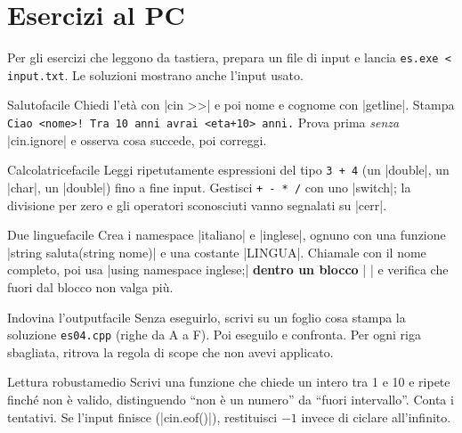 \section{Esercizi al PC}

Per gli esercizi che leggono da tastiera, prepara un file di input e lancia
\texttt{es.exe < input.txt}. Le soluzioni mostrano anche l'input usato.

\begin{esercizio}{Saluto}{facile}
Chiedi l'età con \cc|cin >>| e poi nome e cognome con \cc|getline|. Stampa
\texttt{Ciao <nome>! Tra 10 anni avrai <eta+10> anni.} Prova prima
\emph{senza} \cc|cin.ignore| e osserva cosa succede, poi correggi.
\end{esercizio}

\begin{esercizio}{Calcolatrice}{facile}
Leggi ripetutamente espressioni del tipo \texttt{3 + 4} (un \cc|double|, un
\cc|char|, un \cc|double|) fino a fine input. Gestisci \texttt{+ - * /} con uno
\cc|switch|; la divisione per zero e gli operatori sconosciuti vanno segnalati su \cc|cerr|.
\end{esercizio}

\begin{esercizio}{Due lingue}{facile}
Crea i namespace \cc|italiano| e \cc|inglese|, ognuno con una funzione
\cc|string saluta(string nome)| e una costante \cc|LINGUA|. Chiamale con il nome
completo, poi usa \cc|using namespace inglese;| \textbf{dentro un blocco}
\cc|{ }| e verifica che fuori dal blocco non valga più.
\end{esercizio}

\begin{esercizio}{Indovina l'output}{facile}
Senza eseguirlo, scrivi su un foglio cosa stampa la soluzione
\texttt{es04.cpp} (righe da A a F). Poi eseguilo e confronta. Per ogni riga
sbagliata, ritrova la regola di scope che non avevi applicato.
\end{esercizio}

\begin{esercizio}{Lettura robusta}{medio}
Scrivi una funzione che chiede un intero tra 1 e 10 e ripete finché non è
valido, distinguendo ``non è un numero'' da ``fuori intervallo''. Conta i
tentativi. Se l'input finisce (\cc|cin.eof()|), restituisci $-1$ invece di
ciclare all'infinito.
\end{esercizio}

